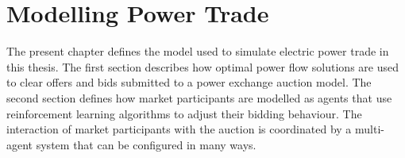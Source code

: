 \chapter{Modelling Power Trade}
\label{ch:method}
The present chapter defines the model used to simulate electric power trade in
this thesis. The first section describes how optimal power flow solutions are used to clear offers and bids submitted to a power exchange auction model.
The second section defines how market participants are modelled as agents that
use reinforcement learning algorithms to adjust their bidding behaviour.
The interaction of market participants with the auction is coordinated by a
multi-agent system that can be configured in many ways.

%
%
